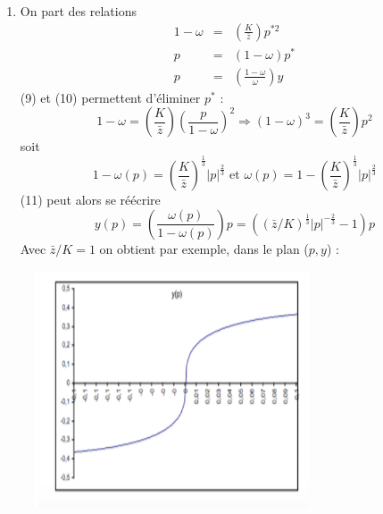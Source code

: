 \documentclass[11pt,a4paper]{article}
\begin{document}
\begin{enumerate}
\item On part des relations%
\begin{eqnarray}
1-\omega &=&\left( \frac{K}{\bar{z}}\right) p^{\ast 2}  \\
p &=&\left( 1-\omega \right) p^{\ast }  \\
p &=&\left( \frac{1-\omega }{\omega }\right) y 
\end{eqnarray}%
\newline
(9) et (10) permettent d'\'{e}liminer $p^{\ast }$ :%
\begin{equation*}
1-\omega =\left( \frac{K}{\bar{z}}\right) \left( \frac{p}{1-\omega }\right)
^{2}\Rightarrow \left( 1-\omega \right) ^{3}=\left( \frac{K}{\bar{z}}\right)
p^{2}
\end{equation*}%
soit%
\begin{equation*}
1-\omega \left( p\right) =\left( \frac{K}{\bar{z}}\right) ^{\frac{1}{3}%
}\left\vert p\right\vert ^{\frac{2}{3}}\text{ \ \ et \ \ }\omega \left(
p\right) =1-\left( \frac{K}{\bar{z}}\right) ^{\frac{1}{3}}\left\vert
p\right\vert ^{\frac{2}{3}}
\end{equation*}%
(11) peut alors se r\'{e}\'{e}crire%
\begin{equation*}
y\left( p\right) =\left( \frac{\omega \left( p\right) }{1-\omega \left(
p\right) }\right) p=\left( \left( \bar{z}/K\right) ^{\frac{1}{3}}\left\vert
p\right\vert ^{-\frac{2}{3}}-1\right) p
\end{equation*}%
Avec $\bar{z}/K=1$ on obtient par exemple, dans le plan ($p,y$) :%

\begin{center}
\includegraphics[width=9cm, height=7cm]{pc3_assets/2.png}
\end{center}


\end{enumerate}
\end{document}
